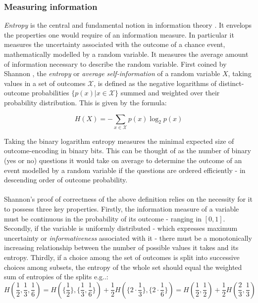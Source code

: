 \documentclass[12pt]{extarticle}
\begin{document}
\subsubsection*{Measuring information}
\noindent \textit{Entropy} is the central and fundamental notion in information theory \cite{Thomas}. It envelops the properties one would require of an information measure. In particular it measures the uncertainty associated with the outcome of a chance event, mathematically modelled by a random variable. It measures the average amount of information necessary to describe the random variable. First coined by Shannon \cite{Shannon}, the \textit{entropy} or \textit{average self-information} of a random variable $X$, taking values in a set of outcomes $\mathcal{X}$, is defined as the negative logarithms of distinct-outcome probabilities $\{p(x)|x\in\mathcal{X}\}$ summed and weighted over their probability distribution. This is given by the formula:

\begin{equation} 
H(X)=-\sum_{x \in \mathcal{X}} p(x)\log_2 p(x) 
\end{equation}

\noindent
Taking the binary logarithm entropy measures the minimal expected size of outcome-encoding in binary bits. This can be thought of as the number of binary (yes or no) questions it would take on average to determine the outcome of an event modelled by a random variable if the questions are ordered efficiently - in descending order of outcome probability.\\ \\
Shannon's proof of correctness of the above definition relies on the necessity for it to possess three key properties. Firstly, the information measure of a variable must be continuous in the probability of its outcome - ranging in $\left[0,1\right]$. Secondly, if the variable is uniformly distributed - which expresses maximum uncertainty or \textit{informativeness} associated with it - there must be a monotonically increasing relationship between the number of possible values it takes and its entropy. Thirdly, if a choice among the set of outcomes is split into successive choices among subsets, the entropy of the whole set should equal the weighted sum of entropies of the splits e.g..: $$H(\frac{1}{2},\frac{1}{3},\frac{1}{6})=H(\{\frac{1}{2}\},\{\frac{1}{3},\frac{1}{6}\})+\frac{1}{2}H(\{2\cdot\frac{1}{3}\},\{2\cdot\frac{1}{6}\})=H(\frac{1}{2},\frac{1}{2})+\frac{1}{2}H(\frac{2}{3},\frac{1}{3})$$
\end{document}
